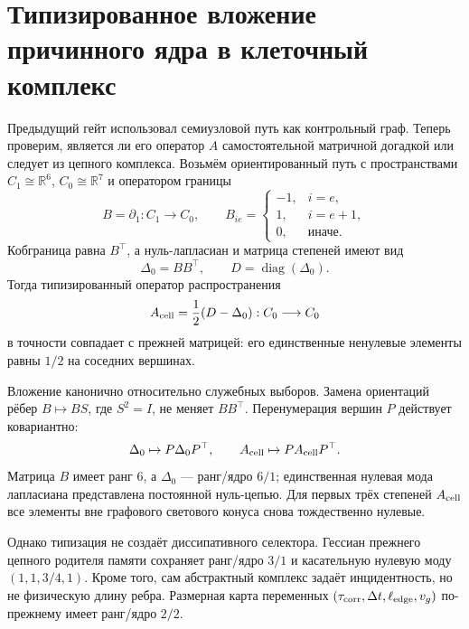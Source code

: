 \chapter{Типизированное вложение причинного ядра в клеточный комплекс}
\label{ch:v10-nonequilibrium-bath-cell-complex-kernel-embedding}

Предыдущий гейт использовал семиузловой путь как контрольный граф. Теперь
проверим, является ли его оператор $A$ самостоятельной матричной догадкой или
следует из цепного комплекса. Возьмём ориентированный путь с пространствами
$C_1\cong\mathbb R^6$, $C_0\cong\mathbb R^7$ и оператором границы
\begin{equation}
 B=\partial_1:C_1\longrightarrow C_0,
 \qquad
 B_{i e}=\begin{cases}-1,&i=e,\\1,&i=e+1,\\0,&\text{иначе}.
 \end{cases}
\end{equation}
Кобграница равна $B^\top$, а нуль-лапласиан и матрица степеней имеют вид
\begin{equation}
 \Delta_0=BB^\top,
 \qquad D=\operatorname{diag}(\Delta_0).
\end{equation}
Тогда типизированный оператор распространения
\begin{equation}
 A_{\rm cell}=\frac12(D-\Delta_0):C_0\longrightarrow C_0
\end{equation}
в точности совпадает с прежней матрицей: его единственные ненулевые элементы
равны $1/2$ на соседних вершинах.

Вложение канонично относительно служебных выборов. Замена ориентаций рёбер
$B\mapsto BS$, где $S^2=I$, не меняет $BB^\top$. Перенумерация вершин
$P$ действует ковариантно:
\begin{equation}
 \Delta_0\mapsto P\Delta_0P^\top,
 \qquad A_{\rm cell}\mapsto PA_{\rm cell}P^\top.
\end{equation}
Матрица $B$ имеет ранг $6$, а $\Delta_0$ --- ранг/ядро $6/1$; единственная
нулевая мода лапласиана представлена постоянной нуль-цепью. Для первых трёх
степеней $A_{\rm cell}$ все элементы вне графового светового конуса снова
тождественно нулевые.

Однако типизация не создаёт диссипативного селектора. Гессиан прежнего
цепного родителя памяти сохраняет ранг/ядро $3/1$ и касательную нулевую моду
$(1,1,3/4,1)$. Кроме того, сам абстрактный комплекс задаёт инцидентность, но
не физическую длину ребра. Размерная карта переменных
$(\tau_{\rm corr},\Delta t,\ell_{\rm edge},v_g)$ по-прежнему имеет
ранг/ядро $2/2$.

